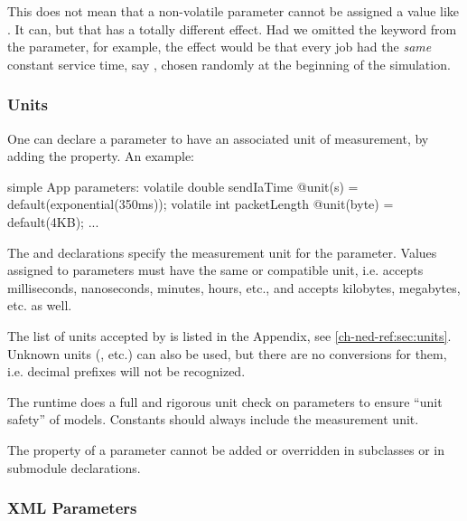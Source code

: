 \begin{note}
    This does not mean that a non-volatile parameter cannot be assigned a value
    like . It can, but that has a totally different
    effect. Had we omitted the  keyword from the
     parameter, for example, the effect would be that every
    job had the \textit{same} constant service time, say ,
    chosen randomly at the beginning of the simulation.
\end{note}

\subsubsection{Units}

One can declare a parameter to have an associated unit of measurement,
by adding the  property. An example:

\begin{ned}
simple App
{
    parameters:
        volatile double sendIaTime @unit(s) = default(exponential(350ms));
        volatile int packetLength @unit(byte) = default(4KB);
    ...
}
\end{ned}

The  and  declarations specify the measurement unit
for the parameter. Values assigned to parameters must have the same or
compatible unit, i.e.  accepts milliseconds, nanoseconds,
minutes, hours, etc., and  accepts kilobytes, megabytes,
etc. as well.

\begin{note}
    The list of units accepted by {\opp} is listed in the Appendix, see
    \ref{ch-ned-ref:sec:units}. Unknown units (, etc.)
    can also be used, but there are no conversions for them,
    i.e. decimal prefixes will not be recognized.
\end{note}

The {\opp} runtime does a full and rigorous unit check on
parameters to ensure ``unit safety'' of models. Constants should
always include the measurement unit.

The  property of a parameter cannot be added or overridden
in subclasses or in submodule declarations.


\subsubsection{XML Parameters}


